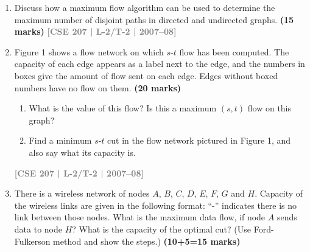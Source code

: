 \documentclass[12pt,a3paper]{article}
\newcommand{\yr}[1]{\hfill\textcolor{gray}{\small\textbf{[#1]}}}
\newcommand{\mk}[1]{\textcolor{orange!70!black}{\small\textbf{(#1 marks)}}}
\begin{document}
\begin{enumerate}
\item Discuss how a maximum flow algorithm can be used to determine the maximum number of disjoint paths in directed and undirected graphs. \mk{15}
\yr{CSE 207 | L-2/T-2 | 2007--08}

\item Figure 1 shows a flow network on which $s$-$t$ flow has been computed. The capacity of each edge appears as a label next to the edge, and the numbers in boxes give the amount of flow sent on each edge. Edges without boxed numbers have no flow on them. \mk{20}
\begin{enumerate}
  \item What is the value of this flow? Is this a maximum $(s, t)$ flow on this graph?
  \item Find a minimum $s$-$t$ cut in the flow network pictured in Figure 1, and also say what its capacity is.
\end{enumerate}
\yr{CSE 207 | L-2/T-2 | 2007--08}

\begin{center}

\end{center}

\item There is a wireless network of nodes $A$, $B$, $C$, $D$, $E$, $F$, $G$ and $H$. Capacity of the wireless links are given in the following format: ``-'' indicates there is no link between those nodes. What is the maximum data flow, if node $A$ sends data to node $H$? What is the capacity of the optimal cut? (Use Ford-Fulkerson method and show the steps.) \mk{10+5=15}


\end{enumerate}
\end{document}
